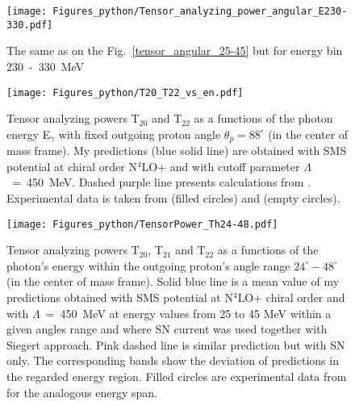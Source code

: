     \begin{figure}[h]
        \begin{center}
        \texttt{[image: Figures\_python/Tensor\_analyzing\_power\_angular\_E230-330.pdf]}
        \end{center}
        \caption{The same as on the Fig.~\ref*{tensor_angular_25-45} but for energy bin 230~-~330~MeV}
        \label{tensor_angular_230-330}
    \end{figure}
        


    \begin{figure}[h]
        \begin{center}
        \texttt{[image: Figures\_python/T20\_T22\_vs\_en.pdf]}
        \end{center}
        \caption{Tensor analyzing powers T$_{20}$ and T$_{22}$ as a functions of the photon energy E$_\gamma$
        with fixed outgoing proton angle $\theta_p = 88^{\circ}$ (in the center of mass frame).
        My predictions (blue solid line) are obtained with SMS potential at chiral order N$^4$LO+
        and with cutoff parameter $\Lambda$~=~450~MeV.
        Dashed purple line presents calculations from \cite{Schmitt1989}.
        Experimental data is taken from \cite{rachek2007} (filled circles)
        and \cite{mishev1993} (empty circles).}
        \label{T20_vs_en}
    \end{figure}

    \begin{figure}[h]
        \begin{center}
        \texttt{[image: Figures\_python/TensorPower\_Th24-48.pdf]}
        \end{center}
        \caption{Tensor analyzing powers T$_{20}$, T$_{21}$ and T$_{22}$ as a functions of the
        photon's energy within the outgoing proton's angle range $24^{\circ} - 48^{\circ}$
        (in the center of mass frame).
        Solid blue line is a mean value of my predictions obtained with
        SMS potential at N$^4$LO+ chiral order and with $\Lambda$~=~450~MeV
        at energy values from 25 to 45 MeV within
        a given angles range and
        where SN current was used together with Siegert approach. 
        Pink dashed line is similar prediction but with SN only. 
        The corresponding bands show the deviation of predictions in the regarded
        energy region.
        Filled circles are experimental data
        from \cite{rachek2007} for the analogous energy span.}
        \label{tensor_energy_24-48}
    \end{figure}

